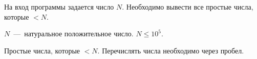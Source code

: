 На вход программы задается число $N$. Необходимо вывести все простые числа, которые $< N$. 

\InputFile

$N$~---~натуральное положительное число. $N \leq 10^5$.

\OutputFile

Простые числа, которые $< N$. Перечислять числа необходимо через пробел.

\SAMPLES

